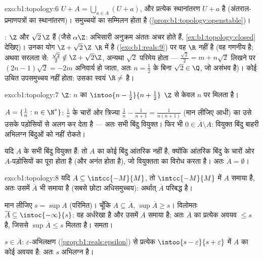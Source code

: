 \begin{solution}{exo:b1:topology:6}
$U + A = \bigcup_{a \in A} (U + a)$, और प्रत्येक स्थानांतरण $U + a$  है
(अंतराल-प्रमाणपत्रों का स्थानांतरण)।  समुच्चयों का सम्मिलन  होता
है (\cref{prop:b1:topology:openstable})।

: $\Z$ और $\sqrt 2\,\Z$  हैं (जैसे $\alpha\Z$: अभिसारी
अनुक्रम अंततः अचर होते हैं, \cref{ex:b1:topology:closed} देखिए)। उनका योग
$\Z + \sqrt 2\,\Z$ $\R$ में  है (\cref{exo:b1:reals:9}) पर वह $\R$ नहीं
है (वह गणनीय है; अथवा सरलता से: $\frac{\sqrt 2}{2} \notin \Z + \sqrt2\Z$,
अन्यथा $\sqrt 2$ परिमेय होता --- $\frac{\sqrt2}{2} = m + n\sqrt 2$ लिखने पर
$(2n - 1)\sqrt 2 = -2m$ अनिवार्य हो जाता, अतः $n = \frac12$ के बिना $\sqrt 2
\in \Q$, जो असंभव है)। कोई  उचित उपसमुच्चय  नहीं होता: उसका 
स्वयं $\R \neq$ है।
\end{solution}

\begin{solution}{exo:b1:topology:7}
$\Z$: $n$ का  $\intoo{n - \frac12}{n + \frac12}$ $\Z$ से केवल $n$ पर
मिलता है।

$A = \{\frac1n : n \in \N^*\}$: $\frac 1n$ के चारों ओर त्रिज्या $\frac{1}{n}
- \frac{1}{n+1} = \frac{1}{n(n+1)}$ (मान लीजिए आधी) का  उसे उसके
पड़ोसियों से अलग कर देता है --- अतः सभी बिंदु वियुक्त। फिर भी $0 \in
\overline A \setminus A$: वियुक्त बिंदु बाहरी अभिलग्न बिंदुओं को नहीं रोकते।

यदि $A$ के सभी बिंदु वियुक्त हैं: तो $A$ का कोई बिंदु आंतरिक नहीं है,
क्योंकि आंतरिक बिंदु के चारों ओर $A$-पड़ोसियों का पूरा  होता है (और
 अनंत होता है), जो वियुक्तता का विरोध करता है। अतः $\mathring A =
\emptyset$।
\end{solution}

\begin{solution}{exo:b1:topology:8}
यदि $A \subseteq \intcc{-M}{M}$, तो  $\intcc{-M}{M}$ में $A$
समाया है, अतः उसमें $\overline A$ भी समाया है (सबसे छोटा  अधिसमुच्चय):
अर्थात् $\overline A$ परिबद्ध है।

मान लीजिए $s = \sup A$ (परिमित)। चूँकि $A \subseteq \overline A$, $\sup
\overline A \geq s$। विलोमतः $\overline A \subseteq \intoc{-\infty}{s}$: वह
अर्धरेखा  है और उसमें $A$ समाया है; अतः $\overline A$ का प्रत्येक अवयव
$\leq s$ है, जिससे $\sup\overline A \leq s$ मिलता है। समता।

$s \in \overline A$: $\varepsilon$-अभिलक्षण (\cref{prop:b1:reals:epsilon})
से प्रत्येक  $\intoo{s - \varepsilon}{s + \varepsilon}$ में $A$ का कोई
अवयव है: अतः $s$ अभिलग्न है।
\end{solution}

